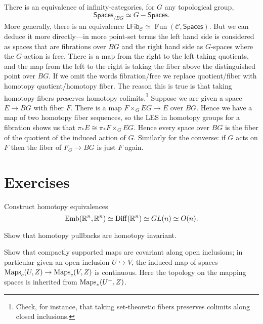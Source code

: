 \documentclass{amsart}
\DeclareMathOperator{\Fun}{Fun}
\DeclareMathOperator{\Emb}{Emb}
\begin{document}
\begin{remark}
    There is an equivalence of infinity-categories, for $G$ any topological group,
    \begin{equation*}
        \mathsf{Spaces}_{/BG} \simeq G-\mathsf{Spaces}.
    \end{equation*}
    More generally, there is an equivalence $\mathsf{LFib}_\mathcal{C}\simeq \Fun(\mathcal{C},\mathsf{Spaces})$.
    But we can deduce it more directly---in more point-set terms the left hand side
    is considered as spaces that are fibrations over $BG$ and the right hand side as
    $G$-spaces where the $G$-action is free. There is a map from the right to the left
    taking quotients, and the map from the left to the right is taking the fiber above
    the distinguished point over $BG$. If we omit the words fibration/free we replace
    quotient/fiber with homotopy quotient/homotopy fiber. The reason this is true is
    that taking homotopy fibers preserves homotopy colimits.\footnote{Check, for instance,
    that taking set-theoretic fibers preserves colimits along closed inclusions.}
    Suppose we are given a
    space $E\to BG$ with fiber $F$. There is a map $F\times_G EG\to E$ over $BG$. Hence
    we have a map of two homotopy fiber sequences, so the LES in homotopy groups for
    a fibration shows us that $\pi_*E\cong\pi_* F\times_GEG$. Hence every space over
    $BG$ is the fiber of the quotient of the induced action of $G$. Similarly
    for the converse: if $G$ acts on $F$ then the fiber of $F_G\to BG$ is just $F$
    again.
\end{remark}


\newpage

\appendix

\section{Exercises}

\begin{exercise}
    Construct homotopy equivalences
    \begin{equation*}
        \Emb(\R^n,\R^n) \simeq \Diff(\R^n) \simeq GL(n) \simeq O(n).
    \end{equation*}
\end{exercise}

\begin{exercise}
    Show that homotopy pullbacks are homotopy invariant.
\end{exercise}

\begin{exercise}
    Show that compactly supported maps are covariant along open inclusions; in particular given an
    open inclusion $U\hookrightarrow V$, the induced map of spaces
    $\operatorname{Maps}_c(U,Z)\to \operatorname{Maps}_c(V,Z)$ is continuous. Here the topology on the mapping spaces is
    inherited from $\operatorname{Maps}_*(U^+,Z)$.
\end{exercise}
\end{document}
